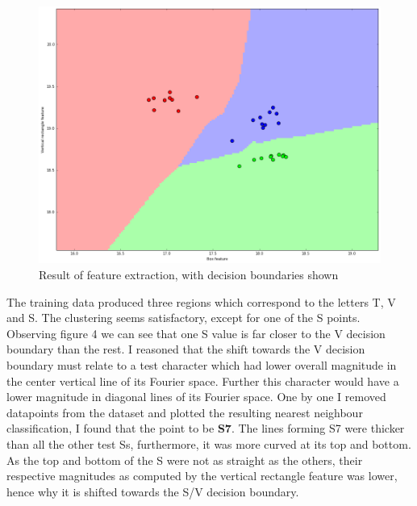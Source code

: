 \documentclass[a4paper,12px,twocolumn]{article}
\begin{document}
\begin{flushleft}
    \begin{figure}[h!]
      \caption{Result of feature extraction, with decision boundaries shown}
      \includegraphics[scale=0.25]{decision}
    \end{figure}



    The training data produced three regions which correspond to the letters T, V and S. The clustering seems satisfactory, except for
    one of the S points. Observing figure 4 we can see that one S value is far closer to the V decision boundary than the rest.
    I reasoned that the shift towards the V decision boundary must relate to a test character which had lower overall magnitude in the
    center vertical line of its Fourier space. Further this character would have a lower magnitude in diagonal lines of its Fourier space.
    One by one I removed datapoints from the dataset and plotted the resulting nearest neighbour classification, I found that the point to be \textbf{S7}.
    The lines forming S7 were thicker than all the other test Ss, furthermore, it was more curved at its top and bottom.
    As the top and bottom of the S were not as straight as the others, their respective magnitudes as computed by the vertical rectangle feature
    was lower, hence why it is shifted towards the S/V decision boundary.


\end{flushleft}
\end{document}
